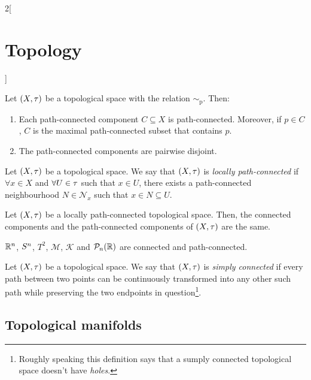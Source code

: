 \documentclass[../../../main_math.tex]{subfiles}
\begin{document}
\begin{multicols}{2}[\section{Topology}]
  \begin{proposition}
    Let $(X,\topo)$ be a topological space with the relation $\sim_\text{p}$. Then:
    \begin{enumerate}
      \item Each path-connected component $C\subseteq X$ is path-connected. Moreover, if $p\in C$, $C$ is the maximal path-connected subset that contains $p$.
      \item The path-connected components are pairwise disjoint.
    \end{enumerate}
  \end{proposition}
  \begin{definition}
    Let $(X,\topo)$ be a topological space. We say that $(X,\topo)$ is \emph{locally path-connected} if $\forall x\in X$ and $\forall U\in\topo$ such that $x\in U$, there exists a path-connected neighbourhood $N\in\mathcal{N}_x$ such that $x\in N\subseteq U$.
  \end{definition}
  \begin{theorem}
    Let $(X,\topo)$ be a locally path-connected topological space. Then, the connected components and the path-connected components of $(X,\topo)$ are the same.
  \end{theorem}
  \begin{proposition}
    $\RR^n$, $\S^n$, $T^2$, $\mathcal{M}$, $\mathcal{K}$ and $\mathcal{P}_n(\RR)$ are connected and path-connected.
  \end{proposition}
  \begin{definition}
    Let $(X,\topo)$ be a topological space. We say that $(X,\topo)$ is \emph{simply connected} if every path between two points can be continuously transformed into any other such path while preserving the two endpoints in question\footnote{Roughly speaking this definition says that a sumply connected topological space doesn't have \emph{holes}.}.
  \end{definition}
  \subsection{Topological manifolds}

\end{multicols}
\end{document}
